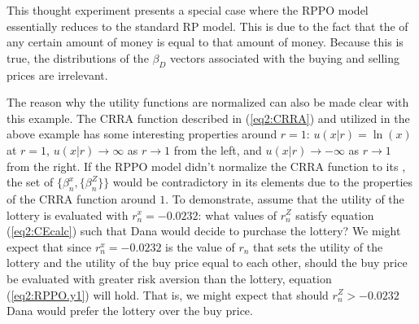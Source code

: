 \documentclass[../main.tex]{subfiles}
\begin{document}
This thought experiment presents a special case where the RPPO model essentially reduces to the standard RP model.
This is due to the fact that the {\CE} of any certain amount of money is equal to that amount of money.
Because this is true, the distributions of the $\beta_D$ vectors associated with the buying and selling prices are irrelevant.{\footnotemark}

\addtocounter{footnote}{-1}

The reason why the utility functions are normalized can also be made clear with this  example.
The CRRA function described in (\ref{eq2:CRRA}) and utilized in the above example has some interesting properties around $r=1$: $u(x|r) = \ln(x)$ at $r=1$, $u(x|r) \to \infty$ as $r \to 1$ from the left, and $u(x|r) \to -\infty$ as $r \to 1$ from the right.{\footnotemark}
If the RPPO model didn't normalize the CRRA function to its {\CE}, the set of $\{\beta_n^x,\{\beta_n^Z\}\}$  would be contradictory in its elements due to the properties of the CRRA function around $1$.
To demonstrate, assume that the utility of the lottery is evaluated with $r_n^x = -0.0232$: what values of $r_n^Z$ satisfy equation (\ref{eq2:CEcalc}) such that Dana would decide to purchase the lottery? We might expect that since $r_n^x = -0.0232$ is the value of $r_n$ that sets the utility of the lottery and the utility of the buy price equal to each other,  should the buy price be evaluated with greater risk aversion than the lottery, equation (\ref{eq2:RPPO.y1}) will hold.
That is, we might expect that should $r_n^Z > -0.0232$ Dana would prefer the lottery over the buy price.

\addtocounter{footnote}{-1}
\end{document}
